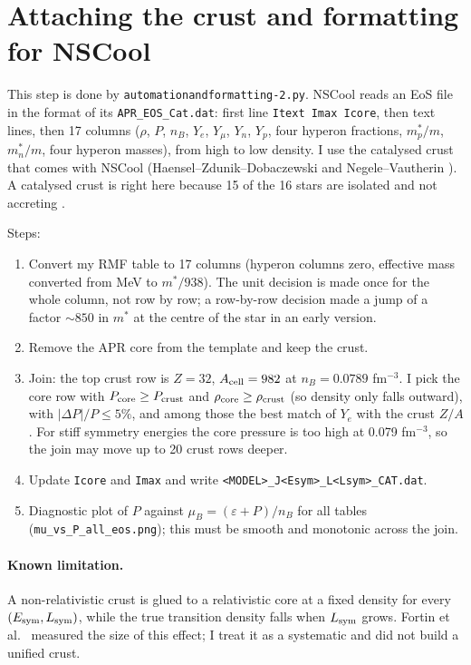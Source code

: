 \documentclass[11pt,a4paper]{article}
\newcommand{\Esym}{E_{\rm sym}}
\newcommand{\Lsym}{L_{\rm sym}}
\begin{document}
\section{Attaching the crust and formatting for NSCool}\label{sec:crust}
This step is done by \texttt{automationandformatting-2.py}. NSCool reads an EoS file in the format of its \texttt{APR\_EOS\_Cat.dat}: first line \texttt{Itext Imax Icore}, then text lines, then 17 columns ($\rho$, $P$, $n_B$, $Y_e$, $Y_\mu$, $Y_n$, $Y_p$, four hyperon fractions, $m^*_p/m$, $m^*_n/m$, four hyperon masses), from high to low density. I use the catalysed crust that comes with NSCool (Haensel--Zdunik--Dobaczewski \cite{HZD1989} and Negele--Vautherin \cite{NegeleVautherin1973}). A catalysed crust is right here because 15 of the 16 stars are isolated and not accreting \cite{BPS1971,DouchinHaensel2001}.

Steps:
\begin{enumerate}
\item Convert my RMF table to 17 columns (hyperon columns zero, effective mass converted from MeV to $m^*/938$). The unit decision is made once for the whole column, not row by row; a row-by-row decision made a jump of a factor $\sim850$ in $m^*$ at the centre of the star in an early version.
\item Remove the APR core from the template and keep the crust.
\item Join: the top crust row is $Z=32$, $A_{\rm cell}=982$ at $n_B=0.0789$ fm$^{-3}$. I pick the core row with $P_{\rm core}\ge P_{\rm crust}$ and $\rho_{\rm core}\ge\rho_{\rm crust}$ (so density only falls outward), with $|\Delta P|/P\le5\%$, and among those the best match of $Y_e$ with the crust $Z/A$. For stiff symmetry energies the core pressure is too high at 0.079 fm$^{-3}$, so the join may move up to 20 crust rows deeper.
\item Update \texttt{Icore} and \texttt{Imax} and write \texttt{<MODEL>\_J<Esym>\_L<Lsym>\_CAT.dat}.
\item Diagnostic plot of $P$ against $\mu_B=(\varepsilon+P)/n_B$ for all tables (\texttt{mu\_vs\_P\_all\_eos.png}); this must be smooth and monotonic across the join.
\end{enumerate}

\paragraph{Known limitation.} A non-relativistic crust is glued to a relativistic core at a fixed density for every $(\Esym,\Lsym)$, while the true transition density falls when $\Lsym$ grows. Fortin et al.\ \cite{Fortin2016} measured the size of this effect; I treat it as a systematic and did not build a unified crust.
\end{document}
